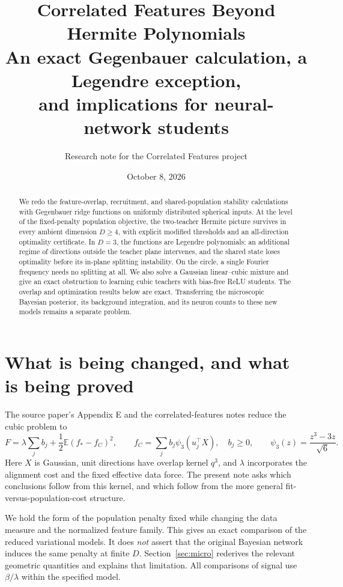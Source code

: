 \documentclass[11pt]{article}
\title{Correlated Features Beyond Hermite Polynomials\\
\large An exact Gegenbauer calculation, a Legendre exception,\\and implications for neural-network students}
\author{Research note for the Correlated Features project}
\date{October 8, 2026}
\newcommand{\E}{\mathbb E}
\theoremstyle{remark}
\begin{document}
\maketitle

\begin{abstract}
We redo the feature-overlap, recruitment, and shared-population stability
calculations with Gegenbauer ridge functions on uniformly distributed
spherical inputs. At the level of the fixed-penalty population objective,
the two-teacher Hermite picture survives in every ambient dimension
$D\geq4$, with explicit modified thresholds and an all-direction
optimality certificate. In $D=3$, the functions are Legendre polynomials:
an additional regime of directions outside the teacher plane intervenes,
and the shared state loses optimality before its in-plane splitting
instability. On the circle, a single Fourier frequency needs no splitting
at all. We also solve a Gaussian linear--cubic mixture and give an exact
obstruction to learning cubic teachers with bias-free ReLU students.
The overlap and optimization results below are exact. Transferring the
microscopic Bayesian posterior, its background integration, and its neuron
counts to these new models remains a separate problem.
\end{abstract}

\section{What is being changed, and what is being proved}

The source paper's Appendix E and the correlated-features notes reduce the
cubic problem to
\begin{equation}\label{eq:original}
 F=\lambda\sum_j b_j+\frac12\E(f_*-f_C)^2,
 \qquad f_C=\sum_j b_j\psi_3(u_j^\top X),\quad b_j\geq0,
 \qquad \psi_3(z)=\frac{z^3-3z}{\sqrt6}.
\end{equation}
Here $X$ is Gaussian, unit directions have overlap kernel $q^3$, and
$\lambda$ incorporates the alignment cost and the fixed effective data
force. The present note asks which conclusions follow from this kernel,
and which follow from the more general fit-versus-population-cost structure.

We hold the form of the population penalty fixed while changing the data
measure and the normalized feature family. This gives an exact comparison
of the reduced variational models. It does \emph{not} assert that the original
Bayesian network induces the same penalty at finite $D$. Section~\ref{sec:micro}
rederives the relevant geometric quantities and explains that limitation.
All comparisons of signal use $\beta/\lambda$ within the specified model.
\end{document}
